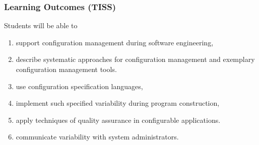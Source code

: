 \begin{frame}
	\frametitle{Learning Outcomes (TISS)}
	Students will be able to

	\begin{enumerate}
	\item support configuration management during software engineering,
	\item describe systematic approaches for configuration management and exemplary configuration management tools.
	\item use configuration specification languages,
	\item implement such specified variability during program construction,
	\item apply techniques of quality assurance in configurable applications.
	\item communicate variability with system administrators.
	\end{enumerate}
\end{frame}

